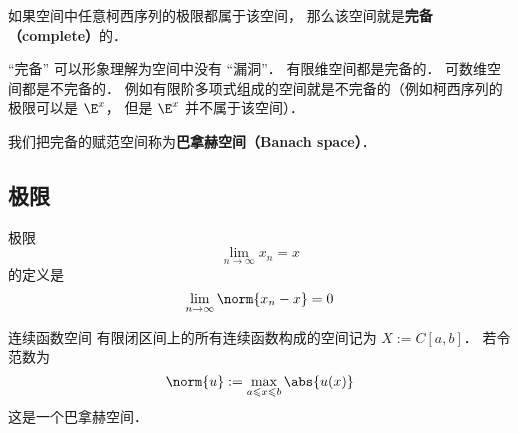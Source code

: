 

如果空间中任意柯西序列的极限都属于该空间， 那么该空间就是\textbf{完备（complete）}的．

“完备” 可以形象理解为空间中没有 “漏洞”． 有限维空间都是完备的． 可数维空间都是不完备的． 例如有限阶多项式组成的空间就是不完备的（例如柯西序列的极限可以是 $\E^x$， 但是 $\E^x$ 并不属于该空间）．

我们把完备的赋范空间称为\textbf{巴拿赫空间（Banach space）}．

\subsection{极限}
极限
\begin{equation}
\lim_{n\to\infty} x_n = x
\end{equation}
的定义是
\begin{equation}
\lim_{n\to\infty} \norm{x_n - x} = 0
\end{equation}


\begin{example}{连续函数空间}
有限闭区间上的所有连续函数构成的空间记为 $X := C[a, b]$． 若令范数为
\begin{equation}
\norm{u} := \max_{a \leqslant x \leqslant b} \abs{u(x)}
\end{equation}
这是一个巴拿赫空间．
\end{example}
